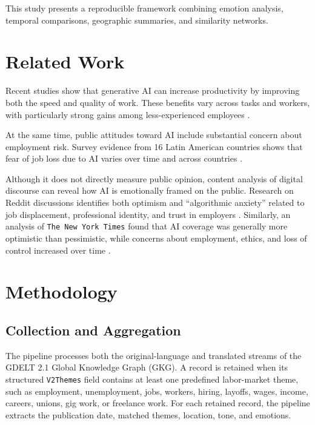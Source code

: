\documentclass[conference]{IEEEtran}
\begin{document}
This study presents a reproducible framework combining emotion analysis, 
temporal comparisons, geographic summaries, and similarity networks.

\section{Related Work}

Recent studies show that generative AI can increase productivity by 
improving both the speed and quality of work. 
These benefits vary across tasks and workers, with particularly strong gains among 
less-experienced employees \cite{noy2023experimental,brynjolfsson2025generative}.

At the same time, public attitudes toward AI include substantial concern about employment risk. 
Survey evidence from 16 Latin American countries shows that fear of job loss 
due to AI varies over time and across countries \cite{cremaschi2025will}.

Although it does not directly measure public opinion, 
content analysis of digital discourse can reveal how AI is emotionally framed on the public. 
Research on Reddit discussions identifies both optimism and “algorithmic anxiety” 
related to job displacement, professional identity, 
and trust in employers \cite{shekhar2026algorithmic}. 
Similarly, an analysis of \texttt{The New York Times} found that 
AI coverage was generally more optimistic than pessimistic, 
while concerns about employment, ethics, and loss of control increased 
over time \cite{fast2017long}.

\section{Methodology}

\subsection{Collection and Aggregation}

The pipeline processes both the original-language and translated 
streams of the GDELT 2.1 Global Knowledge Graph (GKG).
A record is retained when its structured \texttt{V2Themes} field 
contains at least one predefined labor-market theme, such as employment, 
unemployment, jobs, workers, hiring, layoffs, wages, income, careers, unions, 
gig work, or freelance work. 
For each retained record, the pipeline extracts the publication date, 
matched themes, location, tone, and emotions. 
\end{document}
